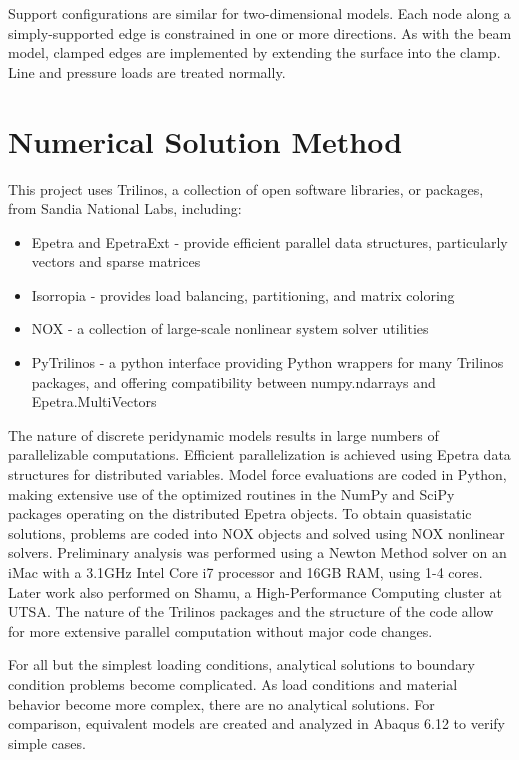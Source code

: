 Support configurations are similar for two-dimensional models.
Each node along a simply-supported edge is constrained in one or more directions.
As with the beam model, clamped edges are implemented by extending the surface into the clamp.
Line and pressure loads are treated normally.

\section{Numerical Solution Method}

This project uses Trilinos, a collection of open software libraries, or packages, from Sandia National Labs, including:
\begin{itemize}
  \item Epetra and EpetraExt - provide efficient parallel data structures, particularly vectors and sparse matrices
  \item Isorropia - provides load balancing, partitioning, and matrix coloring
  \item NOX - a collection of large-scale nonlinear system solver utilities
  \item PyTrilinos - a python interface providing Python wrappers for many Trilinos packages, and offering compatibility between numpy.ndarrays and Epetra.MultiVectors
\end{itemize}

The nature of discrete peridynamic models results in large numbers of parallelizable computations.
Efficient parallelization is achieved using Epetra data structures for distributed variables.
Model force evaluations are coded in Python, making extensive use of the optimized routines in the NumPy and SciPy packages operating on the distributed Epetra objects. 
To obtain quasistatic solutions, problems are coded into NOX objects and solved using NOX nonlinear solvers.
Preliminary analysis was performed using a Newton Method solver on an iMac with a 3.1GHz Intel Core i7 processor and 16GB RAM, using 1-4 cores.
Later work also performed on Shamu, a High-Performance Computing cluster at UTSA.
The nature of the Trilinos packages and the structure of the code allow for more extensive parallel computation without major code changes.

For all but the simplest loading conditions, analytical solutions to boundary condition problems become complicated.
As load conditions and material behavior become more complex, there are no analytical solutions.
For comparison, equivalent models are created and analyzed in Abaqus 6.12 to verify simple cases.
